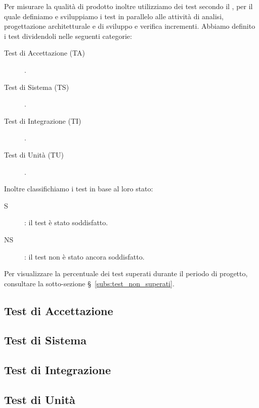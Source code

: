 \documentclass[../piano-di-qualifica.tex]{subfiles}
\begin{document}
Per misurare la qualità di prodotto inoltre utilizziamo dei test secondo il , per il quale definiamo e sviluppiamo i test in parallelo alle attività di analisi, progettazione architetturale e di sviluppo e verifica incrementi.
Abbiamo definito i test dividendoli nelle seguenti categorie:
\begin{description}
  \item [Test di Accettazione (TA)].
  \item [Test di Sistema (TS)].
  \item [Test di Integrazione (TI)].
  \item [Test di Unità (TU)].
\end{description}

Inoltre classifichiamo i test in base al loro stato:
\begin{description}
  \item [S]: il test è stato soddisfatto.
  \item [NS]: il test non è stato ancora soddisfatto.
\end{description}

Per visualizzare la percentuale dei test superati durante il periodo di progetto, consultare la sotto-sezione §~\ref{subs:test_non_superati}.

\subsection{Test di Accettazione}%
\label{subs:test_di_accettazione}


\newpage

\subsection{Test di Sistema}%
\label{subs:test_di_sistema}



\newpage
\subsection{Test di Integrazione}%
\label{subs:test_di_integrazione}



\newpage
\subsection{Test di Unità}%
\label{subs:test_di_unita}


\end{document}
